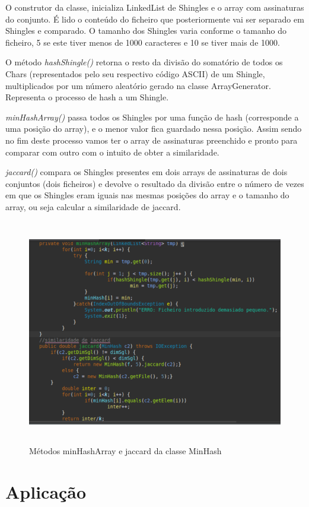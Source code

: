 \documentclass{report}
\begin{document}
O construtor da classe, inicializa LinkedList de Shingles e o array com assinaturas do conjunto. É lido o conteúdo do ficheiro que posteriormente vai ser separado em Shingles e comparado. O tamanho dos Shingles varia conforme o tamanho do ficheiro, 5 se este tiver menos de 1000 caracteres e 10 se tiver mais de 1000.

O método {\itshape hashShingle()} retorna o resto da divisão do somatório de todos os Chars (representados pelo seu respectivo código ASCII) de um Shingle, multiplicados por um número aleatório gerado na classe ArrayGenerator. Representa o processo de hash a um Shingle.

{\itshape minHashArray()} passa todos os Shingles por uma função de hash (corresponde a uma posição do array), e o menor valor fica guardado nessa posição. Assim sendo no fim deste processo vamos ter o array de assinaturas preenchido e pronto para comparar com outro com o intuito de obter a similaridade.

{\itshape jaccard()} compara os Shingles presentes em dois arrays de assinaturas de dois conjuntos (dois ficheiros) e devolve o resultado da divisão entre o número de vezes em que os Shingles eram iguais nas mesmas posições do array e o tamanho do array, ou seja calcular a similaridade de jaccard.

\begin{figure}[h]
\center %
\includegraphics[height=280pt]{min.png}
\caption{Métodos minHashArray e jaccard da classe MinHash}
\label{fig:Fig223}
\end{figure}


\section{Aplicação}
\end{document}
